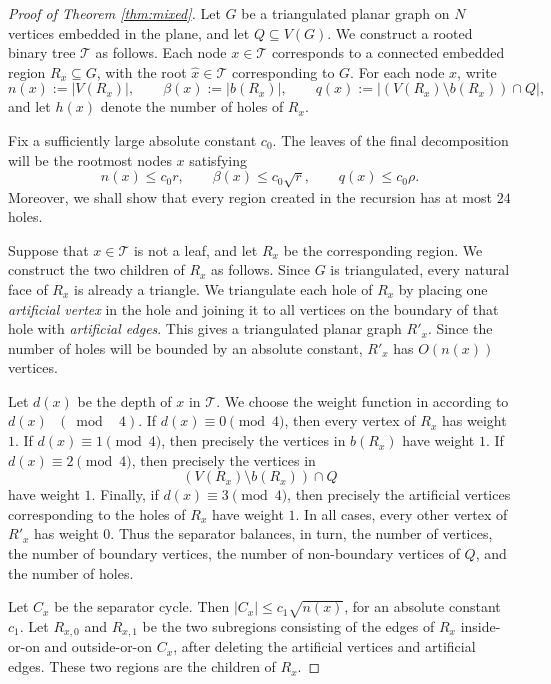 \documentclass[11pt]{article}
\theoremstyle{plain}
\theoremstyle{definition}
\theoremstyle{remark}
\begin{document}
\begin{proof}[Proof of Theorem \ref{thm:mixed}]
Let \(G\) be a triangulated planar graph on \(N\) vertices embedded in the plane, and let \(Q\subseteq V(G)\). We construct a rooted binary tree \(\mathcal T\) as follows. Each node \(x \in \mathcal T\) corresponds to a connected embedded region \(R_x\subseteq G\), with the root \(\hat x \in \mathcal T\) corresponding to \(G\). For each node \(x\), write
\[
n(x):=|V(R_x)|,\qquad
\beta(x):=|b(R_x)|,\qquad
q(x):=|(V(R_x)\setminus b(R_x))\cap Q|,
\]
and let \(h(x)\) denote the number of holes of \(R_x\).

Fix a sufficiently large absolute constant \(c_0\). The leaves of the final decomposition will be the rootmost nodes \(x\) satisfying
\begin{equation}\label{eq:leaf-threshold-rdiv}
n(x)\le c_0 r,\qquad
\beta(x)\le c_0\sqrt r,\qquad
q(x)\le c_0\rho.
\end{equation}
Moreover, we shall show that every region created in the recursion has at most \(24\) holes.

Suppose that \(x\in \mathcal T\) is not a leaf, and let \(R_x\) be the corresponding region. We construct the two children of \(R_x\) as follows. Since \(G\) is triangulated, every natural face of \(R_x\) is already a triangle. We triangulate each hole of \(R_x\) by placing one \emph{artificial vertex} in the hole and joining it to all vertices on the boundary of that hole with \emph{artificial edges}. This gives a triangulated planar graph \(R'_x\). Since the number of holes will be bounded by an absolute constant, \(R'_x\) has \(O(n(x))\) vertices.

Let \(d(x)\) be the depth of \(x\) in \(\mathcal T\). We choose the weight function in  according to \(d(x) \text{ } (\bmod \text{ } 4 )\). If \(d(x)\equiv 0\pmod 4\), then every vertex of \(R_x\) has weight \(1\). If \(d(x)\equiv 1\pmod 4\), then precisely the vertices in \(b(R_x)\) have weight \(1\). If \(d(x)\equiv 2\pmod 4\), then precisely the vertices in
\[
(V(R_x)\setminus b(R_x))\cap Q
\]
have weight \(1\). Finally, if \(d(x)\equiv 3\pmod 4\), then precisely the artificial vertices corresponding to the holes of \(R_x\) have weight \(1\). In all cases, every other vertex of \(R'_x\) has weight \(0\). Thus the separator balances, in turn, the number of vertices, the number of boundary vertices, the number of non-boundary vertices of \(Q\), and the number of holes.

Let \(C_x\) be the separator cycle. Then $|C_x|\le c_1\sqrt{n(x)}$, for an absolute constant \(c_1\). Let \(R_{x,0}\) and \(R_{x,1}\) be the two subregions consisting of the edges of \(R_x\) inside-or-on and outside-or-on \(C_x\), after deleting the artificial vertices and artificial edges. These two regions are the children of \(R_x\).


\end{proof}
\end{document}
